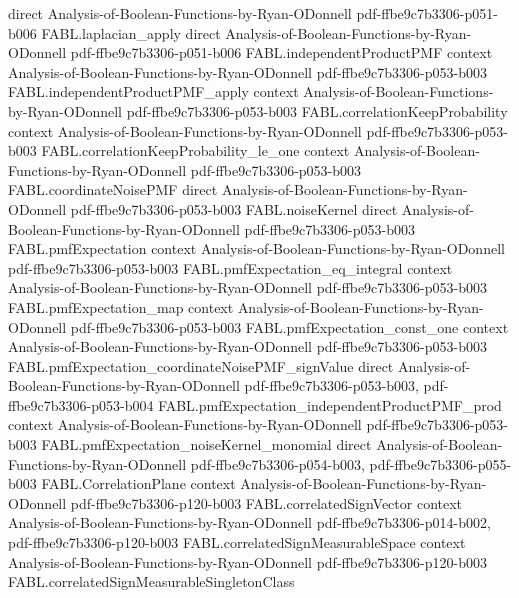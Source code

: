\begin{theorem}
  {direct}
  {Analysis-of-Boolean-Functions-by-Ryan-ODonnell}
  {pdf-ffbe9c7b3306-p051-b006}
\proofstep
  {FABL.laplacian_apply}
  {direct}
  {Analysis-of-Boolean-Functions-by-Ryan-ODonnell}
  {pdf-ffbe9c7b3306-p051-b006}
\proofstep
  {FABL.independentProductPMF}
  {context}
  {Analysis-of-Boolean-Functions-by-Ryan-ODonnell}
  {pdf-ffbe9c7b3306-p053-b003}
\proofstep
  {FABL.independentProductPMF_apply}
  {context}
  {Analysis-of-Boolean-Functions-by-Ryan-ODonnell}
  {pdf-ffbe9c7b3306-p053-b003}
\proofstep
  {FABL.correlationKeepProbability}
  {context}
  {Analysis-of-Boolean-Functions-by-Ryan-ODonnell}
  {pdf-ffbe9c7b3306-p053-b003}
\proofstep
  {FABL.correlationKeepProbability_le_one}
  {context}
  {Analysis-of-Boolean-Functions-by-Ryan-ODonnell}
  {pdf-ffbe9c7b3306-p053-b003}
\proofstep
  {FABL.coordinateNoisePMF}
  {direct}
  {Analysis-of-Boolean-Functions-by-Ryan-ODonnell}
  {pdf-ffbe9c7b3306-p053-b003}
\proofstep
  {FABL.noiseKernel}
  {direct}
  {Analysis-of-Boolean-Functions-by-Ryan-ODonnell}
  {pdf-ffbe9c7b3306-p053-b003}
\proofstep
  {FABL.pmfExpectation}
  {context}
  {Analysis-of-Boolean-Functions-by-Ryan-ODonnell}
  {pdf-ffbe9c7b3306-p053-b003}
\proofstep
  {FABL.pmfExpectation_eq_integral}
  {context}
  {Analysis-of-Boolean-Functions-by-Ryan-ODonnell}
  {pdf-ffbe9c7b3306-p053-b003}
\proofstep
  {FABL.pmfExpectation_map}
  {context}
  {Analysis-of-Boolean-Functions-by-Ryan-ODonnell}
  {pdf-ffbe9c7b3306-p053-b003}
\proofstep
  {FABL.pmfExpectation_const_one}
  {context}
  {Analysis-of-Boolean-Functions-by-Ryan-ODonnell}
  {pdf-ffbe9c7b3306-p053-b003}
\proofstep
  {FABL.pmfExpectation_coordinateNoisePMF_signValue}
  {direct}
  {Analysis-of-Boolean-Functions-by-Ryan-ODonnell}
  {pdf-ffbe9c7b3306-p053-b003,
    pdf-ffbe9c7b3306-p053-b004}
\proofstep
  {FABL.pmfExpectation_independentProductPMF_prod}
  {context}
  {Analysis-of-Boolean-Functions-by-Ryan-ODonnell}
  {pdf-ffbe9c7b3306-p053-b003}
\proofstep
  {FABL.pmfExpectation_noiseKernel_monomial}
  {direct}
  {Analysis-of-Boolean-Functions-by-Ryan-ODonnell}
  {pdf-ffbe9c7b3306-p054-b003,
    pdf-ffbe9c7b3306-p055-b003}
\proofstep
  {FABL.CorrelationPlane}
  {context}
  {Analysis-of-Boolean-Functions-by-Ryan-ODonnell}
  {pdf-ffbe9c7b3306-p120-b003}
\proofstep
  {FABL.correlatedSignVector}
  {context}
  {Analysis-of-Boolean-Functions-by-Ryan-ODonnell}
  {pdf-ffbe9c7b3306-p014-b002,
    pdf-ffbe9c7b3306-p120-b003}
\proofstep
  {FABL.correlatedSignMeasurableSpace}
  {context}
  {Analysis-of-Boolean-Functions-by-Ryan-ODonnell}
  {pdf-ffbe9c7b3306-p120-b003}
\proofstep
  {FABL.correlatedSignMeasurableSingletonClass}

\end{theorem}
